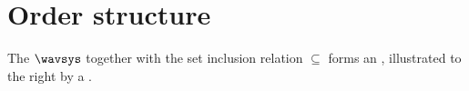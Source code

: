 





\section{Order structure}

\begin{minipage}{\tw-70mm}\raggedright
The  $\wavsys$  together with the 
set inclusion relation $\subseteq$ 
forms an , 
illustrated to the right by a .%
\end{minipage}%
\hfill{}%

